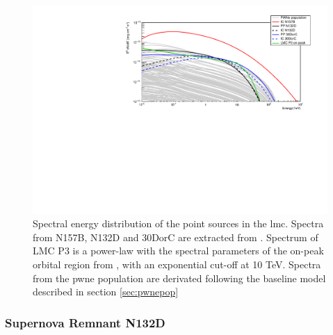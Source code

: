 \documentclass[main.tex]{subfiles}
\begin{document}
\begin{figure}
  \centering
  \includegraphics[width=\textwidth]{Pictures/PointSourcesSpec.pdf}
  \caption{\label{fig:PS} Spectral energy distribution of the point sources in the \gls{lmc}. Spectra from N157B, N132D and 30DorC are extracted from \cite{2015HESSTeVLMC}. Spectrum of LMC P3 is a power-law with the spectral parameters of the on-peak orbital region from \cite{2017HESSLMCP3}, with an exponential cut-off at 10 TeV. Spectra from the \gls{pwne} population are derivated following the baseline model described in section \ref{sec:pwnepop}}
\end{figure}

\subsubsection{Supernova Remnant N132D}
\end{document}
